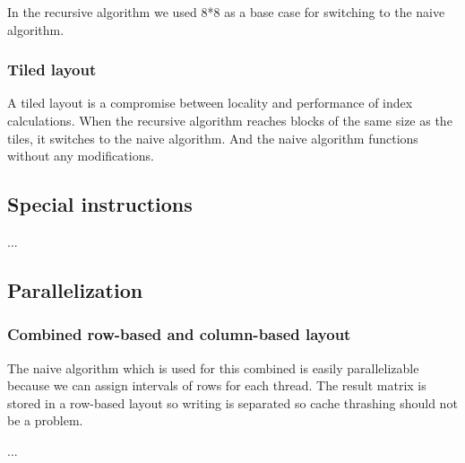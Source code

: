 In the recursive algorithm we used 8*8 as a base case for switching to the naive algorithm.


\subsubsection{Tiled layout}

A tiled layout is a compromise between locality and performance of index calculations. When the recursive algorithm reaches blocks of the same size as the tiles, it switches to the naive algorithm. And the naive algorithm functions without any modifications.

\subsection{Special instructions}

...

\subsection{Parallelization}

\subsubsection{Combined row-based and column-based layout}

The naive algorithm which is used for this combined is easily parallelizable because we can assign intervals of rows for each thread. The result matrix is stored in a row-based layout so writing is separated so cache thrashing should not be a problem.

...

